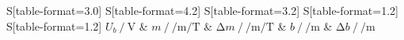 \begin{table}
    \centering
    \caption{Fitparameter: Steigung $m$ und y-Achsenabschnitt $b$.}
    \label{tab:e}
    \begin{tabular}{
	S[table-format=3.0]
	S[table-format=4.2]
	S[table-format=3.2]
	S[table-format=1.2]
	S[table-format=1.2]
	}
	\toprule
	{$U_b \:/\: \si{\volt}$}		& {$m \:/\:\si{\per\metre\per\tesla}$}		& 
	{$\increment{m} \:/\:\si{\per\metre\per\tesla}$}		& {$b \:/\: \si{\per\metre}$}		& 
	{$\increment{b} \:/\:\si{\per\metre}$}		\\ 
	\midrule
    
    \bottomrule
    \end{tabular}
    \end{table}
